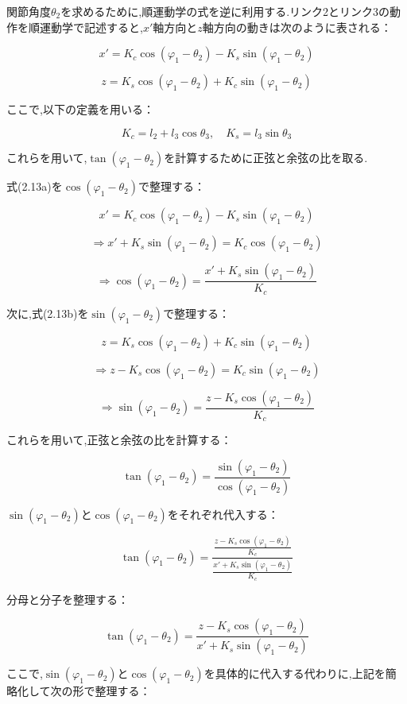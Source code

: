 関節角度$\theta_2$を求めるために,順運動学の式を逆に利用する.リンク2とリンク3の動作を順運動学で記述すると,$x'$軸方向と$z$軸方向の動きは次のように表される：

\[
  x' = K_c \cos(\varphi_1 - \theta_2) - K_s \sin(\varphi_1 - \theta_2) \tag{2.13a}
\]

\[
  z = K_s \cos(\varphi_1 - \theta_2) + K_c \sin(\varphi_1 - \theta_2) \tag{2.13b}
\]

ここで,以下の定義を用いる：

\[
  K_c = l_2 + l_3 \cos \theta_3, \quad K_s = l_3 \sin \theta_3
\]

これらを用いて,$\tan(\varphi_1 - \theta_2)$を計算するために正弦と余弦の比を取る.


式(2.13a)を$\cos(\varphi_1 - \theta_2)$で整理する：

\[
  x' = K_c \cos(\varphi_1 - \theta_2) - K_s \sin(\varphi_1 - \theta_2)
\]

\[
  \Rightarrow x' + K_s \sin(\varphi_1 - \theta_2) = K_c \cos(\varphi_1 - \theta_2)
\]

\[
  \Rightarrow \cos(\varphi_1 - \theta_2) = \frac{x' + K_s \sin(\varphi_1 - \theta_2)}{K_c}
\]

次に,式(2.13b)を$\sin(\varphi_1 - \theta_2)$で整理する：

\[
  z = K_s \cos(\varphi_1 - \theta_2) + K_c \sin(\varphi_1 - \theta_2)
\]

\[
  \Rightarrow z - K_s \cos(\varphi_1 - \theta_2) = K_c \sin(\varphi_1 - \theta_2)
\]

\[
  \Rightarrow \sin(\varphi_1 - \theta_2) = \frac{z - K_s \cos(\varphi_1 - \theta_2)}{K_c}
\]

これらを用いて,正弦と余弦の比を計算する：

\[
  \tan(\varphi_1 - \theta_2) = \frac{\sin(\varphi_1 - \theta_2)}{\cos(\varphi_1 - \theta_2)}
\]

$\sin(\varphi_1 - \theta_2)$と$\cos(\varphi_1 - \theta_2)$をそれぞれ代入する：

\[
  \tan(\varphi_1 - \theta_2) = \frac{\frac{z - K_s \cos(\varphi_1 - \theta_2)}{K_c}}{\frac{x' + K_s \sin(\varphi_1 - \theta_2)}{K_c}}
\]

分母と分子を整理する：

\[
  \tan(\varphi_1 - \theta_2) = \frac{z - K_s \cos(\varphi_1 - \theta_2)}{x' + K_s \sin(\varphi_1 - \theta_2)}
\]

ここで,$\sin(\varphi_1 - \theta_2)$と$\cos(\varphi_1 - \theta_2)$を具体的に代入する代わりに,上記を簡略化して次の形で整理する：

